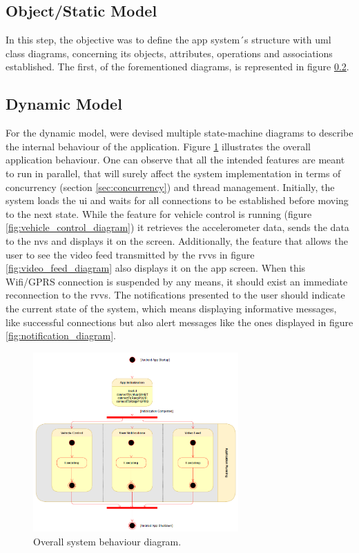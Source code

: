 \subsection{Object/Static Model}
In this step, the objective was to define the app system´s structure with \gls{uml} class diagrams, concerning its objects, attributes, operations and associations established.  The first, of the forementioned diagrams, is represented in figure \ref{}.
%
\subsection{Dynamic Model}
For the dynamic model, were devised multiple state-machine diagrams to describe the internal behaviour of the application. 
%
Figure \ref{fig:overall_system_diagram} illustrates the overall application behaviour. One can observe that all the intended features are meant to run in parallel, that will surely affect the system implementation in terms of concurrency (section \ref{sec:concurrency}) and thread management.
%
Initially, the system loads the \gls{ui} and waits for all connections to be established before moving to the next state.
%
While the feature for vehicle control is running (figure \ref{fig:vehicle_control_diagram}) it retrieves the accelerometer data, sends the data to the \gls{nvs} and displays it on the screen.
%
Additionally, the feature that allows the user to see the video feed transmitted by the \gls{rvvs} in figure \ref{fig:video_feed_diagram} also displays it on the app screen. When this Wifi/GPRS connection is suspended by any means, it should exist an immediate reconnection to the \gls{rvvs}.
%
The notifications presented to the user should indicate the current state of the system, which means displaying informative messages, like successful connections but also alert messages like the ones displayed in figure \ref{fig:notification_diagram}.
%
\begin{figure}[!ht]
\centering
\includegraphics[width=0.7\textwidth]{img/overall_system_sm.png}
\caption{\label{fig:overall_system_diagram}Overall system behaviour diagram.}
\end{figure}
